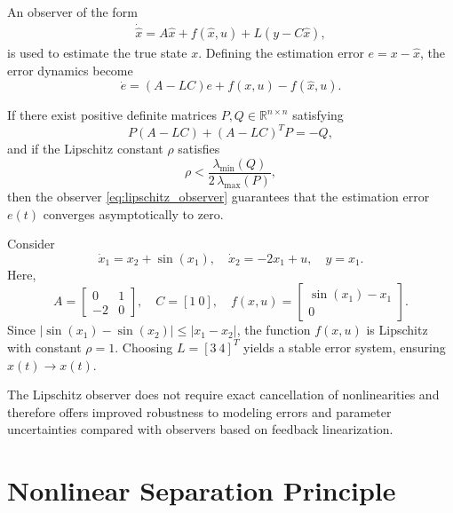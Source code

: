 An observer of the form
\begin{align}
    \dot{\hat{x}} = A\hat{x} + f(\hat{x},u) + L(y - C\hat{x}), \label{eq:lipschitz_observer}
\end{align}
is used to estimate the true state \(x\).  
Defining the estimation error \(e = x - \hat{x}\), the error dynamics become
\[
\dot{e} = (A - L C)e + f(x,u) - f(\hat{x},u).
\]

\begin{theorem}
If there exist positive definite matrices \(P,Q \in \mathbb{R}^{n\times n}\) satisfying
\[
P(A - LC) + (A - LC)^T P = -Q,
\]
and if the Lipschitz constant \(\rho\) satisfies
\[
\rho < \frac{\lambda_{\min}(Q)}{2\,\lambda_{\max}(P)},
\]
then the observer \eqref{eq:lipschitz_observer} guarantees that the estimation error
\(e(t)\) converges asymptotically to zero.
\end{theorem}

\begin{example}
Consider
\[
\dot{x}_1 = x_2 + \sin(x_1), \quad
\dot{x}_2 = -2x_1 + u, \quad
y = x_1.
\]
Here,
\[
A = \begin{bmatrix} 0 & 1 \\ -2 & 0 \end{bmatrix}, \quad
C = [1~0], \quad
f(x,u) = \begin{bmatrix} \sin(x_1) - x_1 \\ 0 \end{bmatrix}.
\]
Since \(|\sin(x_1) - \sin(x_2)| \le |x_1 - x_2|\), the function \(f(x,u)\) is Lipschitz with constant \(\rho = 1\).
Choosing \(L = [3~4]^T\) yields a stable error system, ensuring \(\hat{x}(t) \to x(t)\).
\end{example}

\begin{remark}
The Lipschitz observer does not require exact cancellation of nonlinearities and therefore
offers improved robustness to modeling errors and parameter uncertainties compared with
observers based on feedback linearization.
\end{remark}

\section{Nonlinear Separation Principle}

